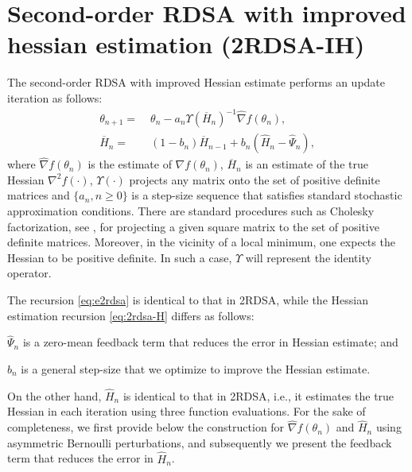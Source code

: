 \chapter{Second-order RDSA with improved hessian estimation (2RDSA-IH)}
\label{sec:2rdsa-ih}
The second-order RDSA with improved Hessian estimate performs an update iteration as follows:
\begin{align}
\label{eq:e2rdsa}
\theta_{n+1} = & \; \theta_n - a_n \Upsilon(\overline H_n)^{-1}\widehat\nabla f(\theta_n), \\
\overline H_n = & \; (1-b_{n})  \overline H_{n-1} + b_{n} ( \widehat H_n - \widehat \Psi_n),\label{eq:2rdsa-H}
\end{align}
where $\widehat\nabla f(\theta_n)$ is the estimate of $\nabla f(\theta_n)$, 
$\overline H_n$ is an estimate of the true Hessian ${\nabla}^2 f(\cdot)$, $\Upsilon(\cdot)$ projects any matrix onto the set of positive definite matrices and $\{a_n, n\ge 0\}$ is a step-size sequence that satisfies standard stochastic approximation conditions. There are standard procedures such as Cholesky factorization, see \cite{bert22}, for projecting a given square matrix to the set of positive definite matrices. Moreover, in the vicinity of a local minimum, one expects the Hessian to be positive definite. In such a case, $\Upsilon$ will represent the identity operator.

The recursion \eqref{eq:e2rdsa} is identical to that in 2RDSA, while the Hessian estimation recursion \eqref{eq:2rdsa-H} differs as follows:\\
\begin{inparaenum}[\bfseries (i)]
\item  $\widehat \Psi_n$ is a zero-mean feedback term that reduces the error in Hessian estimate; and\\
\item $b_n$ is a general step-size that we optimize to improve the Hessian estimate.
\end{inparaenum}

On the other hand, $\widehat H_n$ is identical to that in 2RDSA, i.e., it estimates the true Hessian in each iteration using three function evaluations. %
For the sake of completeness, we first provide below the construction for $\widehat\nabla f(\theta_n)$ and $\widehat H_n$ using asymmetric Bernoulli perturbations, and subsequently we present the feedback term that reduces the error in $\widehat H_n$.

